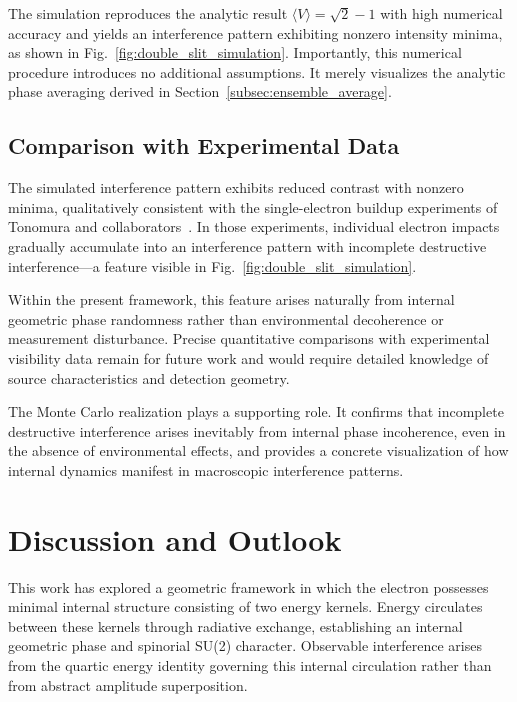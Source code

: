 \documentclass[%
 reprint,
 amsmath,amssymb,
 aps,
 prb,
]{revtex4-2}
\numberwithin{equation}{section}
\begin{document}
The simulation reproduces the analytic result $\langle V \rangle = \sqrt{2} - 1$ with high numerical accuracy and yields an interference pattern exhibiting nonzero intensity minima, as shown in Fig.~\ref{fig:double_slit_simulation}. Importantly, this numerical procedure introduces no additional assumptions. It merely visualizes the analytic phase averaging derived in Section~\ref{subsec:ensemble_average}.


\subsection{Comparison with Experimental Data}
\label{subsec:comparison_experiment}

The simulated interference pattern exhibits reduced contrast with nonzero minima, qualitatively consistent with the single-electron buildup experiments of Tonomura and collaborators~\cite{Tonomura1989}. In those experiments, individual electron impacts gradually accumulate into an interference pattern with incomplete destructive interference---a feature visible in Fig.~\ref{fig:double_slit_simulation}.

Within the present framework, this feature arises naturally from internal geometric phase randomness rather than environmental decoherence or measurement disturbance. Precise quantitative comparisons with experimental visibility data remain for future work and would require detailed knowledge of source characteristics and detection geometry.

The Monte Carlo realization plays a supporting role. It confirms that incomplete destructive interference arises inevitably from internal phase incoherence, even in the absence of environmental effects, and provides a concrete visualization of how internal dynamics manifest in macroscopic interference patterns.


\section{Discussion and Outlook}
\label{sec:discussion}

This work has explored a geometric framework in which the electron possesses minimal internal structure consisting of two energy kernels. Energy circulates between these kernels through radiative exchange, establishing an internal geometric phase and spinorial SU(2) character. Observable interference arises from the quartic energy identity governing this internal circulation rather than from abstract amplitude superposition.
\end{document}
